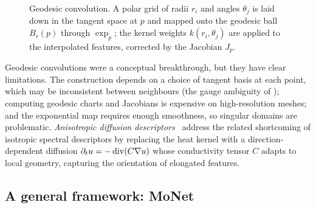 \begin{figure}[h]
\centering
{}
\caption[Geodesic convolution]{Geodesic convolution. A polar grid of radii
$r_i$ and angles $\theta_j$ is laid down in the tangent space at $p$ and mapped
onto the geodesic ball $B_r(p)$ through $\exp_p$; the kernel weights
$k(r_i,\theta_j)$ are applied to the interpolated features, corrected by the
Jacobian $J_p$.}
\label{fig:geo:convolution}
\end{figure}

Geodesic convolutions were a conceptual breakthrough, but they have clear
limitations. The construction depends on a choice of tangent basis at each
point, which may be inconsistent between neighbours (the gauge ambiguity of
); computing geodesic charts and Jacobians is expensive on
high-resolution meshes; and the exponential map requires enough smoothness, so
singular domains are problematic. \emph{Anisotropic diffusion
descriptors}~\citep{Boscaini2016AnisotropicDD} address the related shortcoming
of isotropic spectral descriptors by replacing the heat kernel with a
direction-dependent diffusion $\partial_t u = -\operatorname{div}(C \nabla u)$ whose
conductivity tensor $C$ adapts to local geometry, capturing the orientation of
elongated features.

\subsection{A general framework: MoNet}
\label{subsec:geo:monet}

